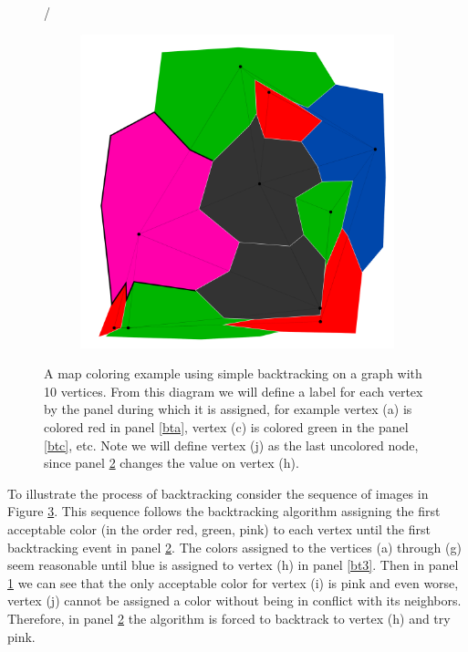 \documentclass{article}
\begin{document}
\begin{figure}[h!]
\begin{subfigure}{0.18\textwidth}
				\caption{}
				\label{bt4}
			\end{subfigure}
			\;
/			\begin{subfigure}{0.18\textwidth}
				\centering
				\includegraphics[width=\textwidth]{images/sequences/simple_backtracking/bt_simple_I00024}
				\caption{}
				\label{bt5}
			\end{subfigure}

			\caption{A map coloring example using simple backtracking on a graph with 10 vertices. From this diagram we will define a label for each vertex by the panel during which it is assigned, for example vertex (a) is colored red in panel \ref{bta}, vertex (c) is colored green in the panel \ref{btc}, etc. Note we will define vertex (j) as the last uncolored node, since panel \ref{bt5} changes the value on vertex (h).}
			\label{simple_ex}
		\end{figure}	
		
		To illustrate the process of backtracking consider the sequence of images in Figure \ref{simple_ex}.
		This sequence follows the backtracking algorithm assigning the first acceptable color (in the order red, green, pink) to each vertex until the first backtracking event in panel \ref{bt5}. The colors assigned to the vertices (a) through (g) seem reasonable until blue is assigned to vertex (h) in panel \ref{bt3}. Then in panel \ref{bt4} we can see that the only acceptable color for vertex (i) is pink and even worse, vertex (j) cannot be assigned a color without being in conflict with its neighbors. Therefore, in panel \ref{bt5} the algorithm is forced to backtrack to vertex (h) and try pink.
		
\end{document}
